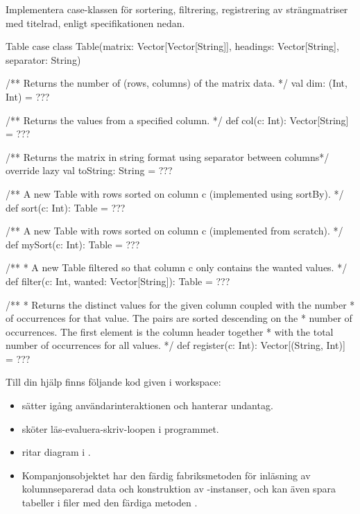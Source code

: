 \Task Implementera case-klassen  för sortering, filtrering, registrering av strängmatriser med titelrad, enligt specifikationen nedan.

\begin{ScalaSpec}{Table}
case class Table(matrix: Vector[Vector[String]],
                 headings: Vector[String],
                 separator: String) {

  /** Returns the number of (rows, columns) of the matrix data. */
  val dim: (Int, Int) = ???

  /** Returns the values from a specified column. */
  def col(c: Int): Vector[String] = ???

  /** Returns the matrix in string format using separator between columns*/
  override lazy val toString: String = ???

  /** A new Table with rows sorted on column c (implemented using sortBy). */
  def sort(c: Int): Table = ???

  /** A new Table with rows sorted on column c (implemented from scratch). */
  def mySort(c: Int): Table = ???

  /**
   * A new Table filtered so that column c only contains the wanted values.
   */
  def filter(c: Int, wanted: Vector[String]): Table = ???

  /**
   * Returns the distinct values for the given column coupled with the number
   * of occurrences for that value. The pairs are sorted descending on the
   * number of occurrences. The first element is the column header together
   * with the total number of occurrences for all values.
   */
  def register(c: Int): Vector[(String, Int)] = ???
}
\end{ScalaSpec}


Till din hjälp finns följande kod given i workspace:
\begin{itemize}
\item {} sätter igång användarinteraktionen och hanterar undantag.

\item {} sköter läs-evaluera-skriv-loopen i programmet.

\item {} ritar diagram i .

\item Kompanjonsobjektet  har den färdig fabriksmetoden  för inläsning av kolumnseparerad data och konstruktion av -instanser, och kan även spara tabeller i filer med den färdiga metoden .
\end{itemize}

